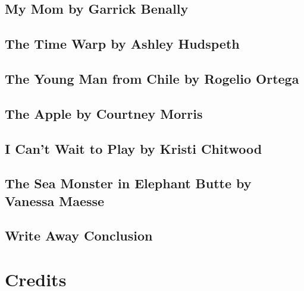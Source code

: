 \subsection{My Mom by Garrick Benally}

\subsection{The Time Warp by Ashley Hudspeth}

\subsection{The Young Man from Chile by Rogelio Ortega}

\subsection{The Apple by Courtney Morris}

\subsection{I Can't Wait to Play by Kristi Chitwood}

\subsection{The Sea Monster in Elephant Butte by Vanessa Maesse}

\subsection{Write Away Conclusion}

\section{Credits}